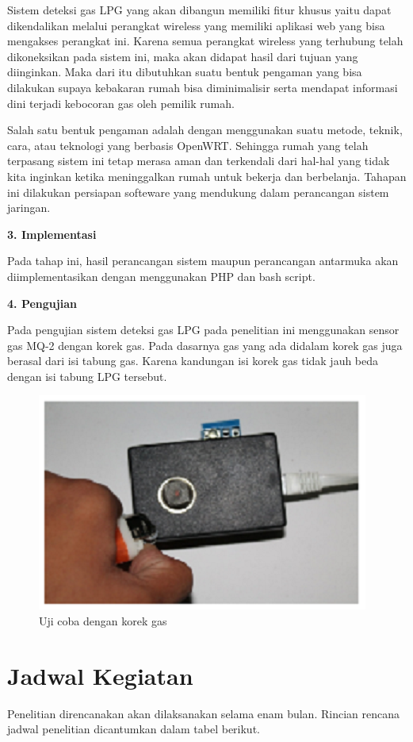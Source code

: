 \documentclass{jtetiproposalskripsi}
\begin{document}
Sistem deteksi gas LPG yang akan dibangun memiliki fitur khusus yaitu dapat dikendalikan melalui perangkat wireless yang memiliki aplikasi web yang bisa mengakses perangkat ini. Karena semua perangkat wireless yang terhubung telah dikoneksikan pada sistem ini, maka akan didapat hasil dari tujuan yang diinginkan. Maka dari itu dibutuhkan suatu bentuk pengaman yang bisa dilakukan supaya kebakaran rumah bisa diminimalisir serta mendapat informasi dini terjadi kebocoran gas oleh pemilik rumah.

Salah satu bentuk pengaman adalah dengan menggunakan suatu metode, teknik, cara, atau teknologi yang berbasis OpenWRT. Sehingga rumah yang telah terpasang sistem ini tetap merasa aman dan terkendali dari hal-hal yang tidak kita inginkan ketika meninggalkan rumah untuk bekerja dan berbelanja.
Tahapan ini dilakukan persiapan softeware yang mendukung dalam perancangan sistem jaringan.

\textbf{3. Implementasi}

Pada tahap ini, hasil perancangan sistem maupun perancangan antarmuka akan diimplementasikan dengan menggunakan PHP dan bash script.

\textbf{4. Pengujian}

Pada pengujian sistem deteksi gas LPG pada penelitian ini menggunakan sensor gas MQ-2 dengan korek gas. Pada dasarnya gas yang ada didalam korek gas juga berasal dari isi tabung gas. Karena kandungan isi korek gas tidak jauh beda dengan isi tabung LPG tersebut.

\begin{figure}[ht!]
  \centering
    \includegraphics{gambar/2}
    \caption{Uji coba dengan korek gas}
    \label{1}
\end{figure}


\section{Jadwal Kegiatan}
Penelitian direncanakan akan dilaksanakan selama enam bulan. Rincian rencana jadwal penelitian dicantumkan dalam tabel berikut.
\end{document}

